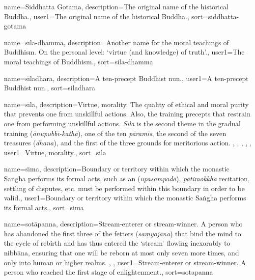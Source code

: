 {
name=Siddhatta Gotama,
description={The original name of the historical Buddha.},
user1={The original name of the historical Buddha.},
sort={siddhatta-gotama}
}

{
name={s\={\i}la-dhamma},
description={Another name for the moral teachings of Buddhism. On the personal level: `virtue (and knowledge) of truth'.},
user1={The moral teachings of Buddhism.},
sort={sila-dhamma}
}

{
name=s\={\i}ladhara,
description={A ten-precept Buddhist nun.},
user1={A ten-precept Buddhist nun.},
sort={siladhara}
}

{
name={s\={\i}la},
description={Virtue, morality. The quality of ethical and moral purity that prevents one from unskillful actions. Also, the training precepts that restrain one from performing unskillful actions. \textit{S\={\i}la} is the second theme in the gradual training (\textit{\=anupubb\={\i}-kath\=a}), one of the ten \textit{p\=aram\={\i}s}, the second of the seven treasures (\textit{dhana}), and the first of the three grounds for meritorious action. \protect \seepre %
\protect {}, \protect {}, \protect {}, \protect {}, \protect {}%
\protect \seepost %
},
user1={Virtue, morality.},
sort={sila}
}

{
name={s\={\i}ma},
description={Boundary or territory within which the monastic Sa\.ngha performs its formal acts, such as an (\textit{upasampad\=a}), \textit{p\=atimokkha} recitation, settling of disputes, etc. must be performed within this boundary in order to be valid.},
user1={Boundary or territory within which the monastic Sa\.ngha performs its formal acts.},
sort={sima}
}

{
name={sot\=apanna},
description={Stream-enterer or stream-winner. A person who has abandoned the first three of the fetters (\textit{sa\d{m}yojana}) that bind the mind to the cycle of rebirth and has thus entered the `stream' flowing inexorably to nibb\=ana, ensuring that one will be reborn at most only seven more times, and only into human or higher realms. \protect \seepre %
\protect {}, \protect {}%
\protect \seepost %
},
user1={Stream-enterer or stream-winner. A person who reached the first stage of enlightenment.},
sort={sotapanna}
}

